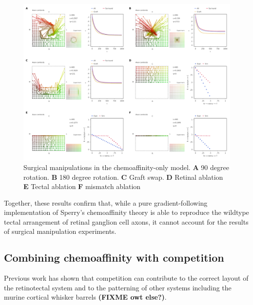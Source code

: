 \documentclass[11pt, a4paper]{article}
\begin{document}
\begin{figure}
\includegraphics[width=0.95\linewidth]{./images/fig_chemo_manipulations.png}
\caption{Surgical manipulations in the chemoaffinity-only model. \textbf{A} 90 degree
rotation. \textbf{B} 180 degree rotation. \textbf{C} Graft swap. \textbf{D}
Retinal ablation \textbf{E} Tectal ablation \textbf{F} mismatch ablation}
\label{f:Gsurg}
\end{figure}

Together, these results confirm that, while a pure gradient-following
implementation of Sperry's chemoaffinity theory is able to reproduce the
wildtype tectal arrangement of retinal ganglion cell axons, it cannot account
for the results of surgical manipulation experiments.

\subsection*{Combining chemoaffinity with competition}

Previous work has shown that competition can contribute to the correct layout
of the retinotectal system \citep{stuff} and to the patterning of other
systems including the murine cortical whisker
barrels \citep{james_modelling_2020} \textbf{(FIXME owt else?)}.
\end{document}
